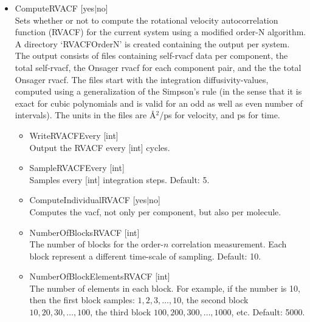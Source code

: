 \begin{itemize}
\item{ComputeRVACF [yes$|$no]}\\
Sets whether or not to compute the rotational velocity autocorrelation function 
(RVACF) for the current system using a modified order-N algorithm.
A directory `RVACFOrderN' is created containing the output per system. The output consists of files containing self-rvacf data per
component, the total self-rvacf, the Onsager rvacf for each component pair, and the the total Onsager rvacf.
The files start with the integration diffusivity-values, computed using a generalization of the Simpson's rule
(in the sense that it is exact for cubic polynomials and is valid for an odd as well as even number of intervals).
The units in the files are \AA$^2$/ps for velocity, and ps for time.
  \begin{itemize}
    \item{WriteRVACFEvery [int]}\\
     Output the RVACF every [int] cycles.
    \item{SampleRVACFEvery [int]}\\
    Samples every [int] integration steps. Default: 5.
    \item{ComputeIndividualRVACF [yes$|$no]}\\
    Computes the vacf, not only per component, but also per molecule.
    \item{NumberOfBlocksRVACF [int]}\\
    The  number of blocks for the order-$n$ correlation measurement. Each block represent a different time-scale of sampling. Default: 10.
    \item{NumberOfBlockElementsRVACF [int]}\\
    The number of elements in each block. For example, if the number is 10, then the first block samples: $1,2,3,\dots,10$, the second block
    $10,20,30,\dots,100$, the third block $100,200,300,\dots,1000$, etc. Default: 5000.
   \end{itemize}


\end{itemize}
